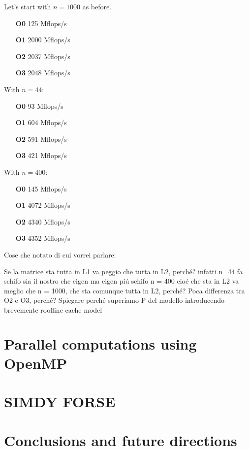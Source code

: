 \documentclass[11pt,a4paper,oneside,titlepage,openright]{book}
\begin{document}
Let's start with $n = 1000$ as before.

\begin{itemize}
\item[\textbf{O0}] 125  Mflops/s
\item[\textbf{O1}] 2000 Mflops/s
\item[\textbf{O2}] 2037 Mflops/s
\item[\textbf{O3}] 2048 Mflops/s
\end{itemize}

With $n = 44$:

\begin{itemize}
\item[\textbf{O0}] 93  Mflops/s
\item[\textbf{O1}] 604 Mflops/s
\item[\textbf{O2}] 591 Mflops/s
\item[\textbf{O3}] 421 Mflops/s
\end{itemize}

With $n=400$:

\begin{itemize}
\item[\textbf{O0}] 145  Mflops/s
\item[\textbf{O1}] 4072 Mflops/s
\item[\textbf{O2}] 4340 Mflops/s
\item[\textbf{O3}] 4352 Mflops/s
\end{itemize}


Cose che notato di cui vorrei parlare:

Se la matrice sta tutta in L1 va peggio che tutta in L2, perch\'e? infatti n=44 fa schifo sia il nostro che eigen ma eigen pi\'u schifo 
n = 400 cio\'e che sta in L2 va meglio che n = 1000, che sta comunque tutta in L2, perch\'e?
Poca differenza tra O2 e O3, perch\'e?
Spiegare perch\'e superiamo P del modello introducendo brevemente roofline cache model 

\chapter{Parallel computations using OpenMP}





\chapter{SIMDY FORSE} 


\chapter{Conclusions and future directions} 
\end{document}
